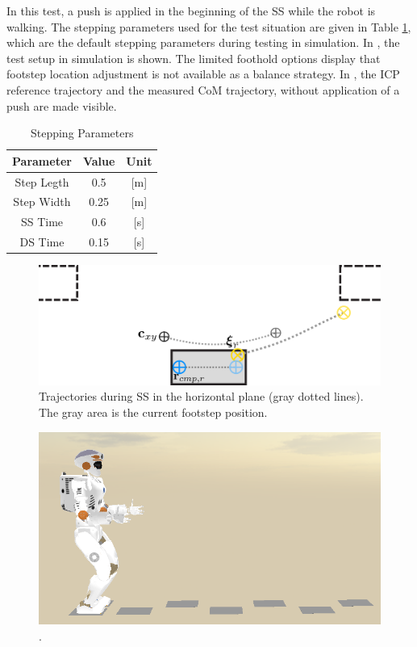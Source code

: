 In this test, a push is applied in the beginning of the \ac{SS} while the robot is walking. The stepping parameters used for the test situation are given in Table \ref{tab:stepping}, which are the default stepping parameters during testing in simulation. In , the test setup in simulation is shown. The limited foothold options display that footstep location adjustment is not available as a balance strategy. In , the \ac{ICP} reference trajectory and the measured \ac{CoM} trajectory, without application of a push are made visible. 
\begin{table}[ht]
\caption{Stepping Parameters} %
\centering %
\begin{tabular}{c c c } %
\hline\hline %
Parameter & Value & Unit \\
\hline %
Step Legth & 0.5 &  [m]\\
Step Width & 0.25 & [m]\\
\acs{SS} Time & 0.6 & [s]\\
\acs{DS} Time & 0.15 & [s]\\
\hline %
\end{tabular}
\label{tab:stepping} %
\end{table}
\begin{figure}[h]
\centering
  \includegraphics[width=.8\linewidth]{STYLESTUFF/ICPplan3StepComICPrSS.png}
   \caption{Trajectories during \ac{SS} in the horizontal plane (gray dotted lines). The gray area is the current footstep position.}
    \label{fig:3foot}
\end{figure}
\begin{figure}[h]
\centering
  \includegraphics[width=.8\linewidth]{STYLESTUFF/valwalkingtest.png}
   \caption{.}
    \label{fig:valwalkingtest}
\end{figure}
